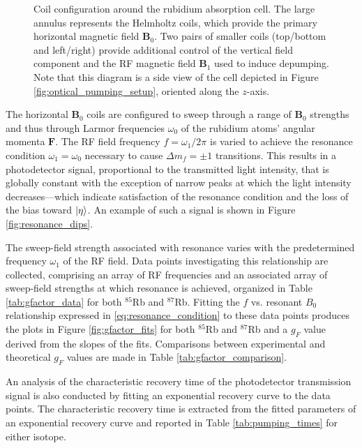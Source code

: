 \documentclass[11pt]{article}
\begin{document}
\begin{figure}[H]
  \centering
  \resizebox{0.7\textwidth}{!}{}
  \caption{Coil configuration around the rubidium absorption
    cell. The large annulus represents the Helmholtz coils, which provide
    the primary horizontal magnetic field $\mathbf{B}_0$. Two pairs of
    smaller coils (top/bottom and left/right) provide additional control of
    the vertical field component and the RF magnetic field $\mathbf{B}_1$
    used to induce depumping. Note that this diagram is a side view of the
    cell depicted in Figure \ref{fig:optical_pumping_setup}, oriented along the
  $z$-axis.}
  \label{fig:helmholtz_coils}
\end{figure}

The horizontal $\mathbf{B}_0$ coils are configured to sweep through a range of
$\mathbf{B}_0$ strengths and thus through Larmor frequencies
$\omega_0$ of the rubidium atoms' angular momenta $\mathbf{F}$. The
RF field frequency $f = \omega_1 / 2\pi$ is
varied to achieve the resonance condition $\omega_1 = \omega_0$
necessary to cause $\Delta m_f = \pm 1$ transitions. This results in
a photodetector signal, proportional to the transmitted light intensity,
that is globally constant with the exception of narrow peaks at which
the light intensity decreases---which indicate satisfaction of the
resonance condition and the loss of the bias toward
$\ket {\eta}$. An example of such a signal is shown in Figure
\ref{fig:resonance_dips}.

The sweep-field strength associated with resonance varies with the predetermined
frequency $\omega_1$ of the RF field. Data points investigating this
relationship are collected, comprising an array of RF frequencies and
an associated array of sweep-field strengths at which resonance is achieved,
organized in Table \ref{tab:gfactor_data} for both $^{85}$Rb and
$^{87}$Rb. Fitting the $f$ vs. resonant $B_0$ relationship expressed
in \eqref{eq:resonance_condition} to these
data points produces
the plots in Figure \ref{fig:gfactor_fits} for both $^{85}$Rb and
$^{87}$Rb and a $g_F$ value derived from the slopes of the fits. Comparisons
between experimental and theoretical $g_F$ values are made in Table
\ref{tab:gfactor_comparison}.

An analysis of the characteristic recovery time of the photodetector
transmission signal is also conducted by fitting an exponential recovery curve
to the data points. The characteristic recovery time is extracted
from the fitted parameters of an exponential recovery curve
and reported in Table \ref{tab:pumping_times} for either isotope.
\end{document}
